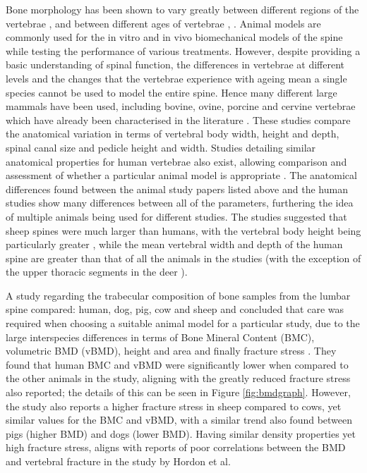 Bone morphology has been shown to vary greatly between different regions
of the vertebrae \cite{hulme2007regional}, \cite{thomsen2002zone} and between
different ages
of
vertebrae \cite{thomsen2002zone}, \cite{ebbesen1999age}. Animal models are
commonly used for
the in
vitro and in vivo biomechanical models of the spine while testing the
performance of various treatments. However, despite providing a basic
understanding of spinal function, the differences in vertebrae at
different levels and the changes that the vertebrae experience with ageing
mean a single species cannot be used to model the entire spine. Hence
many different large mammals have been used, including bovine, ovine,
porcine and cervine vertebrae which have already been characterised in
the literature \cite{wilke1997sheep,kandziora2001comparison,kumar2000anatomy}. These studies
compare the
anatomical
variation in terms of vertebral body width, height and depth, spinal
canal size and pedicle height and width. Studies detailing similar
anatomical properties for human vertebrae also exist, allowing
comparison and assessment of whether a particular animal model is
appropriate \cite{panjabi1991cervical,Manohar1992}. The
anatomical differences found
between
the animal study papers listed above and the human studies show many
differences between all of the parameters, furthering the idea of
multiple animals being used for different studies. The studies suggested
that sheep spines were much larger than humans, with the vertebral body
height being particularly greater \cite{kumar2000anatomy,kandziora2001comparison}, while the
mean
vertebral width and depth of the human spine are greater than that of
all the animals in the studies (with the exception of the upper thoracic
segments in the deer \cite{kumar2000anatomy}).

A study regarding the trabecular composition of bone samples from the
lumbar spine compared: human, dog, pig, cow and sheep and concluded that
care was required when choosing a suitable animal model for a particular
study, due to the large interspecies differences in terms of Bone Mineral Content (BMC),
volumetric BMD (vBMD), height and area and finally fracture stress
\cite{aerssens1998interspecies}. They found that human BMC and vBMD were
significantly lower
when compared to the other animals in the study, aligning with the
greatly reduced fracture stress also reported; the details of this can
be seen in Figure \ref{fig:bmdgraph}. However, the study also reports a
higher fracture
stress in sheep compared to cows, yet similar values for the BMC and
vBMD, with a similar trend also found between pigs (higher BMD) and dogs
(lower BMD). Having similar density properties yet high fracture stress,
aligns with reports of poor correlations between the BMD and vertebral
fracture in the study by Hordon et al\cite{Aaron2000}.



